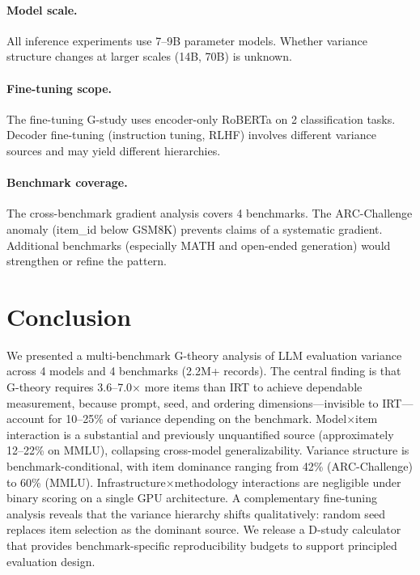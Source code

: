 \documentclass[11pt,letterpaper]{article}
\begin{document}
\paragraph{Model scale.}
All inference experiments use 7--9B parameter models.
Whether variance structure changes at larger scales (14B, 70B) is unknown.

\paragraph{Fine-tuning scope.}
The fine-tuning G-study uses encoder-only RoBERTa on 2 classification tasks.
Decoder fine-tuning (instruction tuning, RLHF) involves different variance sources and may yield different hierarchies.

\paragraph{Benchmark coverage.}
The cross-benchmark gradient analysis covers 4 benchmarks.
The ARC-Challenge anomaly (item\_id below GSM8K) prevents claims of a systematic gradient.
Additional benchmarks (especially MATH and open-ended generation) would strengthen or refine the pattern.

\section{Conclusion}

We presented a multi-benchmark G-theory analysis of LLM evaluation variance across 4 models and 4 benchmarks (2.2M+ records).
The central finding is that G-theory requires 3.6--7.0$\times$ more items than IRT to achieve dependable measurement, because prompt, seed, and ordering dimensions---invisible to IRT---account for 10--25\% of variance depending on the benchmark.
Model$\times$item interaction is a substantial and previously unquantified source (approximately 12--22\% on MMLU), collapsing cross-model generalizability.
Variance structure is benchmark-conditional, with item dominance ranging from 42\% (ARC-Challenge) to 60\% (MMLU).
Infrastructure$\times$methodology interactions are negligible under binary scoring on a single GPU architecture.
A complementary fine-tuning analysis reveals that the variance hierarchy shifts qualitatively: random seed replaces item selection as the dominant source.
We release a D-study calculator that provides benchmark-specific reproducibility budgets to support principled evaluation design.


\end{document}
